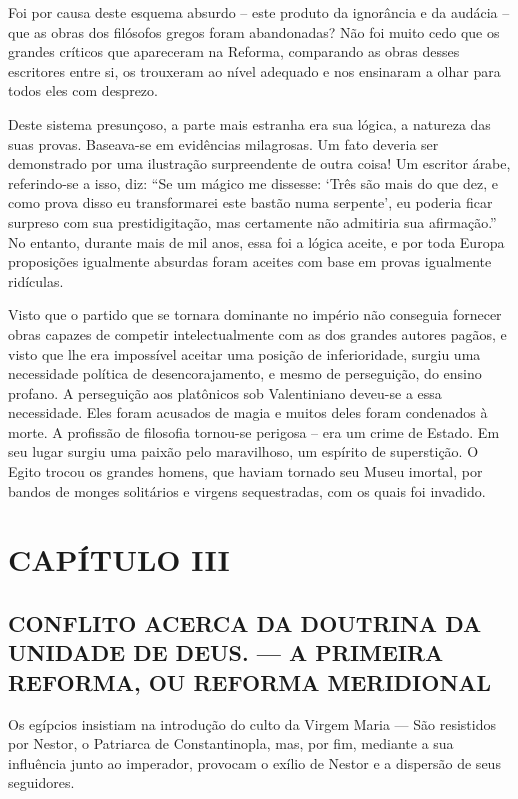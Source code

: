 \documentclass[11pt,a5paper,twoside,openany]{book}
\begin{document}
Foi por causa deste esquema absurdo – este produto da ignorância e da audácia – que as obras dos filósofos gregos foram abandonadas? Não foi muito cedo que os grandes críticos que apareceram na Reforma, comparando as obras desses escritores entre si, os trouxeram ao nível adequado e nos ensinaram a olhar para todos eles com desprezo.

Deste sistema presunçoso, a parte mais estranha era sua lógica, a natureza das suas provas. Baseava-se em evidências milagrosas. Um fato deveria ser demonstrado por uma ilustração surpreendente de outra coisa! Um escritor árabe, referindo-se a isso, diz: “Se um mágico me dissesse: ‘Três são mais do que dez, e como prova disso eu transformarei este bastão numa serpente’, eu poderia ficar surpreso com sua prestidigitação, mas certamente não admitiria sua afirmação.” No entanto, durante mais de mil anos, essa foi a lógica aceite, e por toda Europa proposições igualmente absurdas foram aceites com base em provas igualmente ridículas.

Visto que o partido que se tornara dominante no império não conseguia fornecer obras capazes de competir intelectualmente com as dos grandes autores pagãos, e visto que lhe era impossível aceitar uma posição de inferioridade, surgiu uma necessidade política de desencorajamento, e mesmo de perseguição, do ensino profano. A perseguição aos platônicos sob Valentiniano deveu-se a essa necessidade. Eles foram acusados ​​de magia e muitos deles foram condenados à morte. A profissão de filosofia tornou-se perigosa – era um crime de Estado. Em seu lugar surgiu uma paixão pelo maravilhoso, um espírito de superstição. O Egito trocou os grandes homens, que haviam tornado seu Museu imortal, por bandos de monges solitários e virgens sequestradas, com os quais foi invadido.

\clearpage
\chapter*{CAPÍTULO III}
\section*{CONFLITO ACERCA DA DOUTRINA DA UNIDADE DE DEUS. — A PRIMEIRA REFORMA, OU REFORMA MERIDIONAL}
Os egípcios insistiam na introdução do culto da Virgem Maria — São resistidos por Nestor, o Patriarca de Constantinopla, mas, por fim, mediante a sua influência junto ao imperador, provocam o exílio de Nestor e a dispersão de seus seguidores.
\end{document}
